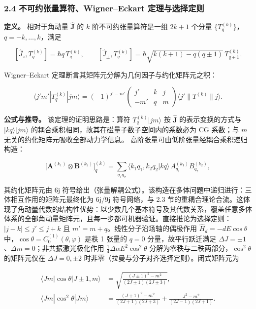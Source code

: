 \documentclass[
]{ctexbook}
\begin{document}
\hypertarget{ux4e0dux53efux7ea6ux5f20ux91cfux7b97ux7b26wignereckart-ux5b9aux7406ux4e0eux9009ux62e9ux5b9aux5219}{%
\subsubsection{2.4 不可约张量算符、Wigner--Eckart
定理与选择定则}\label{ux4e0dux53efux7ea6ux5f20ux91cfux7b97ux7b26wignereckart-ux5b9aux7406ux4e0eux9009ux62e9ux5b9aux5219}}

\textbf{定义。} 相对于角动量 \(\hat{\mathbf{J}}\) 的 \(k\)
阶不可约张量算符是一组 \(2k+1\) 个分量
\(\{T^{(k)}_q\}\)，\(q=-k,\ldots,k\)，满足

\[[\hat{J}_z,T^{(k)}_q]=\hbar q\,T^{(k)}_q,\qquad
[\hat{J}_{\pm},T^{(k)}_q]=\hbar\sqrt{k(k+1)-q(q\pm1)}\,T^{(k)}_{q\pm1}.\]

Wigner--Eckart 定理断言其矩阵元分解为几何因子与约化矩阵元之积：

\[\langle j'm'|T^{(k)}_q|jm\rangle
=(-1)^{j'-m'}\begin{pmatrix} j' & k & j \\ -m' & q & m \end{pmatrix}\langle j'\|T^{(k)}\|j\rangle.\]

\textbf{公式与推导。} 该定理的证明思路是：算符 \(T^{(k)}_q|jm\rangle\)
按 \(\hat{\mathbf{J}}\) 的表示变换的方式与 \(|kq\rangle|jm\rangle\)
的耦合乘积相同，故其在磁量子数子空间内的系数必为 CG 系数；与 \(m\)
无关的约化矩阵元吸收全部动力学信息。
高阶张量可由低阶张量经耦合乘积递归构造：

\[\bigl[\mathbf{A}^{(k_1)}\otimes\mathbf{B}^{(k_2)}\bigr]^{(k)}_{q}
=\sum_{q_1q_2}\langle k_1q_1,k_2q_2|kq\rangle\,A^{(k_1)}_{q_1}B^{(k_2)}_{q_2},\]

其约化矩阵元由 6j
符号给出（张量解耦公式）。该构造在多体问题中递归进行：三体相互作用的矩阵元最终化为
6j/9j 符号网络，与 2.3
节的重耦合理论合流。这体现了角动量代数的结构性优势：以少数几个基本符号及其代数关系，覆盖任意多体体系的全部角动量矩阵元，且每一步都可机器验证。直接推论为选择定则：\(|j-k|\le j'\le j+k\)
且 \(m'=m+q\)。线性分子沿场轴的偶极作用 \(\hat{H}_{d}=-dE\cos\theta\)
中，\(\cos\theta=C^{(1)}_0(\theta,\varphi)\) 是秩 1 张量的 \(q=0\)
分量，故平行跃迁满足
\(\Delta J=\pm1\)、\(\Delta m=0\)；非共振激光极化作用
\(\frac14\Delta\alpha E^{2}\cos^{2}\theta\)
分解为零秩与二秩两部分，\(\cos^{2}\theta\) 的矩阵元仅在
\(\Delta J=0,\pm2\) 时非零（拉曼与分子对齐选择定则）。闭式矩阵元为

\[
\begin{aligned}
\langle J m|\cos\theta|J\pm1,m\rangle
&=\sqrt{\frac{(J\pm1)^{2}-m^{2}}{(2J\pm1)(2J\pm3)}},\\
\langle J m|\cos^{2}\theta|J m\rangle
&=\frac{(J+1)^{2}-m^{2}}{(2J+1)(2J+3)}
+\frac{J^{2}-m^{2}}{(2J-1)(2J+1)}.
\end{aligned}
\]
\end{document}
